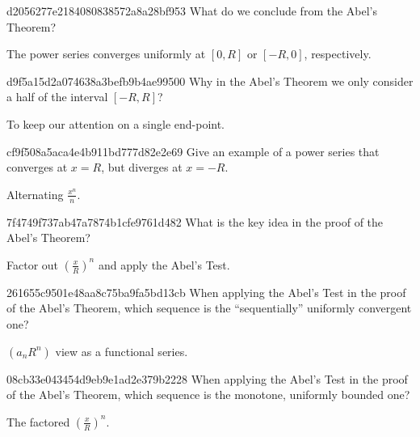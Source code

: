 \begin{note}{d2056277e2184080838572a8a28bf953}
    What do we conclude from the Abel's Theorem?

    \begin{cloze}{1}
        The power series converges uniformly at \({ [0, R] }\) or \({ [-R, 0] }\), respectively.
    \end{cloze}
\end{note}

\begin{note}{d9f5a15d2a074638a3befb9b4ae99500}
    Why in the Abel's Theorem we only consider a half of the interval \({ [-R, R] }\)?

    \begin{cloze}{1}
        To keep our attention on a single end-point.
    \end{cloze}
\end{note}

\begin{note}{cf9f508a5aca4e4b911bd777d82e2e69}
    Give an example of a power series that converges at \({ x = R }\), but diverges at \({ x = -R }\).

    \begin{cloze}{1}
        Alternating \({ \frac{x^{n}}{n} }\).
    \end{cloze}
\end{note}

\begin{note}{7f4749f737ab47a7874b1cfe9761d482}
    What is the key idea in the proof of the Abel's Theorem?

    \begin{cloze}{1}
        Factor out \({ \left( \frac{x}{R} \right)^{n} }\) and apply the Abel's Test.
    \end{cloze}
\end{note}

\begin{note}{261655c9501e48aa8c75ba9fa5bd13cb}
    When applying the Abel's Test in the proof of the Abel's Theorem, which sequence is the ``sequentially'' uniformly convergent one?

    \begin{cloze}{1}
        \({ \left( a_n R^{n} \right) }\) view as a functional series.
    \end{cloze}
\end{note}

\begin{note}{08cb33e043454d9eb9e1ad2e379b2228}
    When applying the Abel's Test in the proof of the Abel's Theorem, which sequence is the monotone, uniformly bounded one?

    \begin{cloze}{1}
        The factored \({ \left( \frac{x}{R} \right)^{n} }\).
    \end{cloze}
\end{note}

